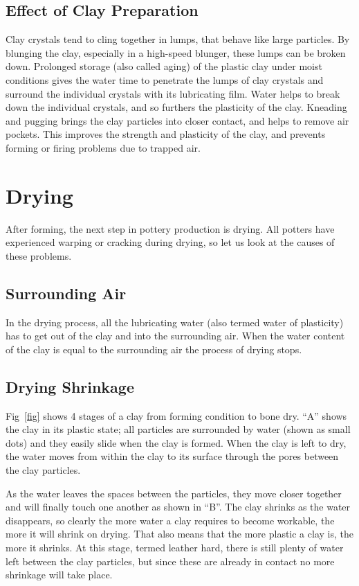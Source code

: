 \subsection{Effect of Clay Preparation}
Clay crystals tend to cling together in lumps, that behave like large 
particles. By blunging the clay, especially in a high-speed blunger, these 
lumps can be broken down. Prolonged storage (also called aging) of the plastic 
clay under moist conditions gives the water time to penetrate the lumps of clay 
crystals and surround the individual crystals with its lubricating film. Water 
helps to break down the individual crystals, and so furthers the plasticity of 
the clay. Kneading and pugging brings the clay particles into closer contact, 
and helps to remove air pockets. This improves the strength and plasticity of 
the clay, and prevents forming or firing problems due to trapped air.
\section{Drying}
After forming, the next step in pottery production is drying. All potters have 
experienced warping or cracking during drying, so let us look at the causes of 
these problems.
\subsection{Surrounding Air}
In the drying process, all the lubricating water (also termed water of 
plasticity) has to get out of the clay and into the surrounding air. When the 
water content of the clay is equal to the surrounding air the process of drying 
stops.
\subsection{Drying Shrinkage}
Fig~\ref{fig} shows 4 stages of a clay from forming condition to bone dry. 
``A'' shows the clay in its plastic state; all particles are surrounded by 
water (shown as small dots) and they easily slide when the clay is formed. When 
the clay is left to dry, the water moves from within the clay to its surface 
through the pores between the clay particles.

As the water leaves the spaces between the particles, they move closer together 
and will finally touch one another as shown in ``B''. The clay shrinks as the 
water disappears, so clearly the more water a clay requires to become workable, 
the more it will shrink on drying. That also means that the more plastic a clay 
is, the more it shrinks. At this stage, termed leather hard, there is still 
plenty of water left between the clay particles, but since these are already in 
contact no more shrinkage will take place.
